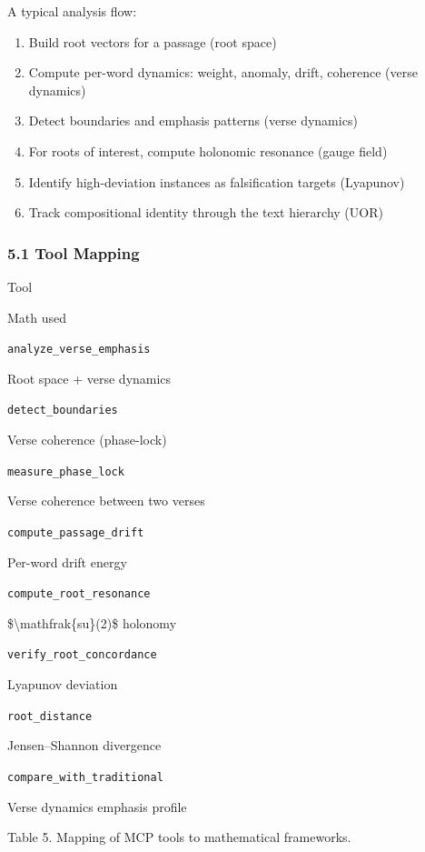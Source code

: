 \documentclass[12pt,a4paper]{article}
\providecommand{\tightlist}{\setlength{\itemsep}{0pt}\setlength{\parskip}{0pt}}
\begin{document}
A typical analysis flow:

\begin{enumerate}
\tightlist
\item
  Build root vectors for a passage {(root space)}
\item
  Compute per-word dynamics: weight, anomaly, drift, coherence {(verse
  dynamics)}
\item
  Detect boundaries and emphasis patterns {(verse dynamics)}
\item
  For roots of interest, compute holonomic resonance {(gauge field)}
\item
  Identify high-deviation instances as falsification targets
  {(Lyapunov)}
\item
  Track compositional identity through the text hierarchy {(UOR)}
\end{enumerate}

\subsubsection{5.1 Tool Mapping}\label{tool-mapping}

Tool

Math used

\texttt{analyze\_verse\_emphasis}

Root space + verse dynamics

\texttt{detect\_boundaries}

Verse coherence (phase-lock)

\texttt{measure\_phase\_lock}

Verse coherence between two verses

\texttt{compute\_passage\_drift}

Per-word drift energy

\texttt{compute\_root\_resonance}

\$\textbackslash mathfrak\{su\}(2)\$ holonomy

\texttt{verify\_root\_concordance}

Lyapunov deviation

\texttt{root\_distance}

Jensen--Shannon divergence

\texttt{compare\_with\_traditional}

Verse dynamics emphasis profile

Table 5. Mapping of MCP tools to mathematical frameworks.
\end{document}

